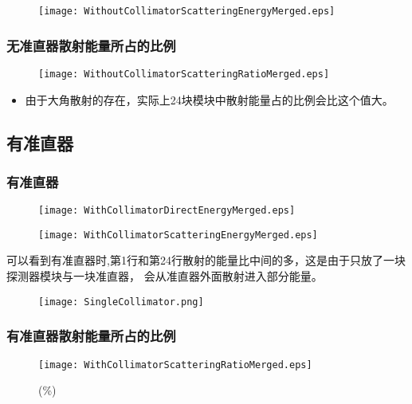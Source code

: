 \documentclass{beamer}
\begin{document}
\begin{CJK*}{UTF8}{gkai}
\begin{frame}
\begin{minipage}[t]{0.7\textwidth}
\begin{figure}[ht]
        \texttt{[image: WithoutCollimatorScatteringEnergyMerged.eps]}
      \end{figure}
    \end{minipage}
  \end{frame}
  \begin{frame}\frametitle{无准直器散射能量所占的比例}
    \begin{figure}[ht]
      \centering
      \texttt{[image: WithoutCollimatorScatteringRatioMerged.eps]}
    \end{figure}
    \liuhao
    \vskip -1cm
    \begin{itemize}
      \item 由于大角散射的存在，实际上24块模块中散射能量占的比例会比这个值大。
    \end{itemize}
  \end{frame}
  \subsection{有准直器}
  \begin{frame}\frametitle{有准直器}
    \begin{minipage}[t]{0.7\textwidth}
      \vskip -0.5cm
      \begin{figure}[ht]
        \centering
        \texttt{[image: WithCollimatorDirectEnergyMerged.eps]}
        
        \texttt{[image: WithCollimatorScatteringEnergyMerged.eps]}
      \end{figure}
    \end{minipage}
    \begin{minipage}[t]{0.29\textwidth}
      \vskip 1cm
      \liuhao
      可以看到有准直器时,第1行和第24行散射的能量比中间的多，这是由于只放了一块探测器模块与一块准直器，
      会从准直器外面散射进入部分能量。
      \begin{figure}[ht]
	\centering
	\texttt{[image: SingleCollimator.png]}
      \end{figure}
    \end{minipage}
  \end{frame}
  \begin{frame}\frametitle{有准直器散射能量所占的比例}
    \begin{figure}[ht]
      \centering
      \texttt{[image: WithCollimatorScatteringRatioMerged.eps]}
      \caption{(\%)}
    \end{figure}
  \end{frame}

\end{CJK*}
\end{document}
